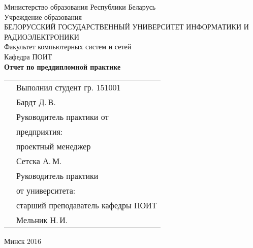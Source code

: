 \begin{titlepage}
    
    \begin{center}
        Министерство образования Республики Беларусь \\[0.4cm] 

        Учреждение образования \\

        \MakeUppercase{БЕЛОРУССКИЙ ГОСУДАРСТВЕННЫЙ УНИВЕРСИТЕТ ИНФОРМАТИКИ И РАДИОЭЛЕКТРОНИКИ} \\[0.4cm]

        Факультет компьютерных систем и сетей \\[0.4cm]

        Кафедра ПОИТ \\[3.4cm] %

        {\large\bfseries{Отчет по преддипломной практике}} \\[2cm]

        \noindent
        \begin{tabular}{p{}p{}}
            & Выполнил студент гр. 151001 \\
            & Бардт Д.\,В. \\[1cm]

            & Руководитель практики от \\
            & предприятия: \\
            & проектный менеджер \\
            & Сетска А.\,М. \\[1cm]

            & Руководитель практики \\
            & от университета: \\
            & старший преподаватель кафедры ПОИТ \\
            & Мельник Н.\,И. \\
        \end{tabular}

        \vfill

        {\normalsize Минск 2016}
    \end{center}

\end{titlepage}
